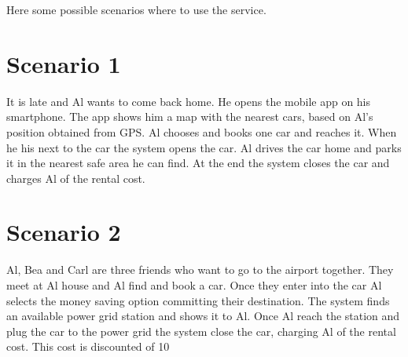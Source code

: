 Here some possible scenarios where to use the service.
\section{Scenario 1}
It is late and Al wants to come back home. He opens the mobile app on his smartphone. The app shows him a map with the nearest cars, based on Al's position obtained from GPS. Al chooses and books one car and reaches it. When he his next to the car the system opens the car. Al drives the car home and parks it in the nearest safe area he can find. At the end the system closes the car and charges Al of the rental cost.
\section{Scenario 2}
Al, Bea and Carl are three friends who want to go to the airport together. They meet at Al house and Al find and book a car. Once they enter into the car Al selects the money saving option committing their destination. The system finds an available power grid station and shows it to Al. Once Al reach the station and plug the car to the power grid the system close the car, charging Al of the rental cost. This cost is discounted of 10%